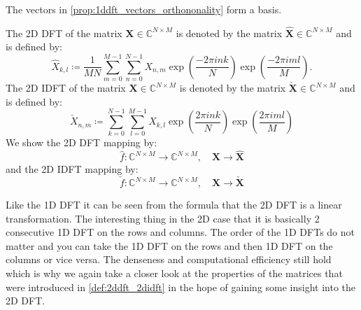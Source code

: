 \begin{Prop}
    The vectors in \cref{prop:1ddft_vectors_orthononality} form a basis.
\end{Prop}
\begin{Def}\label{def:2ddft_2didft}
    The 2D \ac{DFT} of the matrix $\boldsymbol{X} \in \mathbb{C}^{N \times M}$ is denoted by 
    the matrix $\hat {\boldsymbol{X}} \in \mathbb{C}^{N \times M}$ and is defined by:
    \begin{equation}\label{eq:2ddft}
        {\hat X}_{k,l} \coloneqq \frac{1}{MN}\sum_{m=0}^{M-1}\sum_{n=0}^{N-1} X_{n,m}\exp\left({\frac{-2\pi ink}{N}}\right)\exp\left({\frac{-2\pi iml}{M}}\right).
    \end{equation}
    The 2D \ac{IDFT} of the matrix $\boldsymbol{X} \in \mathbb{C}^{N \times M}$ is denoted by 
    the matrix $\check {\boldsymbol{X}} \in \mathbb{C}^{N \times M}$ and is defined by:
    \begin{equation}\label{eq:2didft}
        \check X_{n,m} \coloneqq \sum_{k=0}^{N-1}\sum_{l=0}^{M-1}X_{k,l}\exp\left({\frac{2\pi ink}{N}}\right)\exp\left({\frac{2\pi iml}{M}}\right)
    \end{equation}   
    We show the 2D \ac{DFT} mapping by:
    \begin{equation}
        \hat f \colon \mathbb{C}^{N \times M} \to \mathbb{C}^{N \times M} , \quad \boldsymbol{X} \to \hat{\boldsymbol{X}}
    \end{equation} 
    and the 2D \ac{IDFT} mapping by:
    \begin{equation}
        \check f \colon \mathbb{C}^{N \times M} \to \mathbb{C}^{N \times M} , \quad \boldsymbol{X} \to \check{\boldsymbol{X}}
    \end{equation}
\end{Def}

\begin{Rem}
Like the 1D \ac{DFT} it can be seen from the formula that the 2D \ac{DFT} is a linear transformation. 
The interesting thing in the 2D case that it is basically 2 consecutive 1D \ac{DFT} on the rows and columns. 
The order of the 1D \ac{DFT}s do not matter and you can take the 1D \ac{DFT} on the rows and then 1D 
\ac{DFT} on the columns or vice versa. The denseness and computational efficiency still hold which is why 
we again take a closer look at the properties of the matrices that were introduced in \cref{def:2ddft_2didft} in the hope of gaining
some insight into the 2D {DFT}.
\end{Rem}

